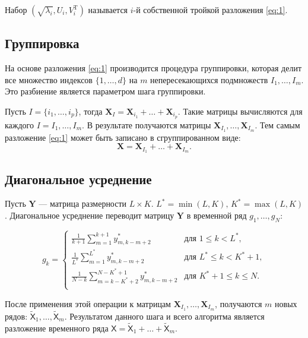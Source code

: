 \documentclass[12pt, specialist, subf
]{disser}
\theoremstyle{definition}
\newcommand{\TS}{\mathsf{X}}
\begin{document}
Набор $( \sqrt{\lambda_i}, U_i, V_{i}^{\mathrm{T}})$ называется $i$-й собственной тройкой разложения \eqref{eq:1}.

\subsection*{Группировка}
На основе разложения \eqref{eq:1} производится процедура группировки, которая делит все множество индексов $\{1, \dots, d\}$ на $m$ непересекающихся подмножеств $I_1, \dots, I_m$. Это разбиение является параметром шага группировки.

Пусть $I = \{i_1, \dots, i_p\}$, тогда $\mathbf{X}_I =
	\mathbf{X}_{i_1} + \dots + \mathbf{X}_{i_p}$. Такие матрицы вычисляются для каждого $I = I_1, \dots, I_m$.
В результате получаются матрицы $\mathbf{X}_{I_1}, \dots, \mathbf{X}_{I_m}$. Тем самым разложение \eqref{eq:1} может быть записано в сгруппированном виде:
\begin{equation*}
	\mathbf{X} = \mathbf{X}_{I_1} + \dots + \mathbf{X}_{I_m}.
\end{equation*}

\subsection*{Диагональное усреднение}
Пусть $\mathbf{Y}$ --- матрица размерности $L \times K$. $L^* = \min(L, K), \, K^* = \max(L,K)$. Диагональное усреднение переводит матрицу $\mathbf{Y}$ в временной ряд $g_1, \dots, g_{N} $:

\begin{equation*}
	g_{k}=
	\begin{cases}
		\frac{1}{k+1} \sum\limits_{m=1}^{k+1} y_{m,k-m+2}^{*}           &
		\text{для } 1 \leq k < L^*,                                       \\

		\frac{1}{L^{*}} \sum\limits_{m=1}^{L^*} y_{m,k-m+2}^{*}         &
		\text{для } L^* \leq k < K^*+1 ,                                  \\

		\frac{1}{N-k} \sum\limits_{m=k-K^*+2}^{N-K^*+1} y_{m,k-m+2}^{*} &
		\text{для } K^*+1 \leq k \leq N .                                 \\
	\end{cases}
\end{equation*}


После применения этой операции к матрицам $ \mathbf{X}_{I_1}, \dots, \mathbf{X}_{I_m}$, получаются $m$ новых рядов: $\widetilde{\TS}_1, \dots, \widetilde{\TS}_m$.
Результатом данного шага и всего алгоритма является разложение временного ряда $\TS  = \widetilde{\TS}_1 + \dots + \widetilde{\TS}_m$.
\end{document}
